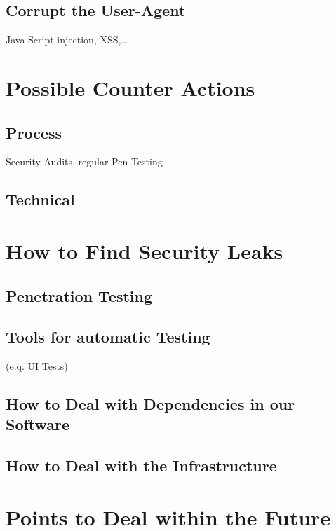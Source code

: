 \subsection{Corrupt the User-Agent}
Java-Script injection, XSS,...

\section{Possible Counter Actions}

\subsection{Process}
Security-Audits, regular Pen-Testing

\subsection{Technical}

\section{How to Find Security Leaks}


\subsection{Penetration Testing}


\subsection{Tools for automatic Testing}
(e.q. UI Tests)


\subsection{How to Deal with Dependencies in our Software}
\subsection{How to Deal with the Infrastructure}
\section{Points to Deal within the Future}
